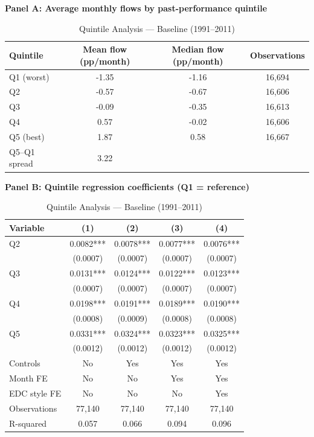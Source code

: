 \documentclass{article}
\begin{document}
\begin{table}[htbp]
\centering
\caption{Quintile Analysis --- Baseline (1991--2011)}
\label{tab:quintile-baseline}
\small
\begin{threeparttable}

\textbf{Panel A: Average monthly flows by past-performance quintile}

\vspace{0.2cm}

\begin{tabular}{lccc}
\toprule
Quintile & Mean flow (pp/month) & Median flow (pp/month) & Observations \\
\midrule
Q1 (worst) & -1.35 & -1.16 & 16,694 \\
Q2 & -0.57 & -0.67 & 16,606 \\
Q3 & -0.09 & -0.35 & 16,613 \\
Q4 & 0.57 & -0.02 & 16,606 \\
Q5 (best) & 1.87 & 0.58 & 16,667 \\
\midrule
Q5--Q1 spread & 3.22 & & \\
\bottomrule
\end{tabular}

\vspace{0.45cm}

\textbf{Panel B: Quintile regression coefficients (Q1 = reference)}

\vspace{0.2cm}

\begin{tabular}{lcccc}
\toprule
Variable & (1) & (2) & (3) & (4) \\
\midrule
Q2 & 0.0082*** & 0.0078*** & 0.0077*** & 0.0076*** \\
 & (0.0007) & (0.0007) & (0.0007) & (0.0007) \\
Q3 & 0.0131*** & 0.0124*** & 0.0122*** & 0.0123*** \\
 & (0.0007) & (0.0007) & (0.0007) & (0.0007) \\
Q4 & 0.0198*** & 0.0191*** & 0.0189*** & 0.0190*** \\
 & (0.0008) & (0.0009) & (0.0008) & (0.0008) \\
Q5 & 0.0331*** & 0.0324*** & 0.0323*** & 0.0325*** \\
 & (0.0012) & (0.0012) & (0.0012) & (0.0012) \\
\midrule
Controls & No & Yes & Yes & Yes \\
Month FE & No & No & Yes & Yes \\
EDC style FE & No & No & No & Yes \\
Observations & 77,140 & 77,140 & 77,140 & 77,140 \\
R-squared & 0.057 & 0.066 & 0.094 & 0.096 \\
\bottomrule
\end{tabular}


\end{threeparttable}
\end{table}
\end{document}

